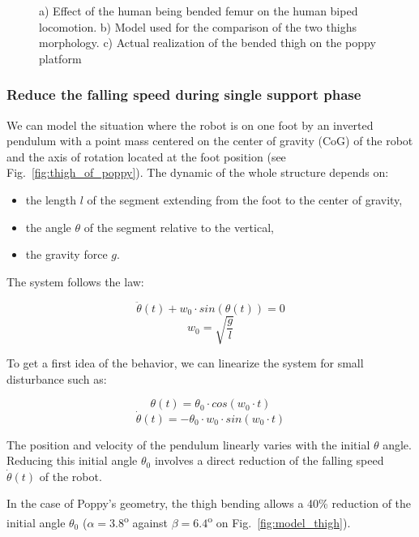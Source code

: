\begin{figure}
\centering
    \hfil
    \hfil
    \caption{ a) Effect of the human being bended femur on the human biped locomotion.
    b) Model used for the comparison of the two thighs morphology.
    c) Actual realization of the bended thigh on the poppy platform}
    \label{fig:poppy_thigh}
\end{figure}

\subsubsection{Reduce the falling speed during single support phase} %
\label{ssub:recude_the_lateral_falling_speed}

We can model the situation where the robot is on one foot by an inverted pendulum with a point mass centered on the center of gravity (CoG) of the robot and the axis of rotation located at the foot position (see Fig.~\ref{fig:thigh_of_poppy}).
The dynamic of the whole structure depends on:

\begin{itemize}
    \item the length $l$ of the segment extending from the foot to the center of gravity,
    \item the angle $\theta$ of the segment relative to the vertical,
    \item the gravity force $g$.
\end{itemize}

The system follows the law:

$$\ddot{\theta}(t) + w_0 \cdot sin(\theta(t)) = 0$$
$$w_0 = \sqrt{\frac{g}{l}}$$

To get a first idea of the behavior, we can linearize the system for small disturbance such as:

$$\theta(t) = \theta_0 \cdot cos(w_0\cdot t)$$
$$\dot{\theta}(t) = -\theta_0 \cdot w_0 \cdot sin(w_0\cdot t)$$

The position and velocity of the pendulum linearly varies with the initial $\theta$ angle.
Reducing
this initial angle $\theta_0$ involves a direct reduction of the falling speed $\dot{\theta}(t)$ of
the robot.

In the case of Poppy's geometry, the thigh bending allows a 40\% reduction of the initial
angle $\theta_0$ ($\alpha = 3.8$\textsuperscript{o} against $ \beta = 6.4$\textsuperscript{o} on
Fig.~\ref{fig:model_thigh}).

